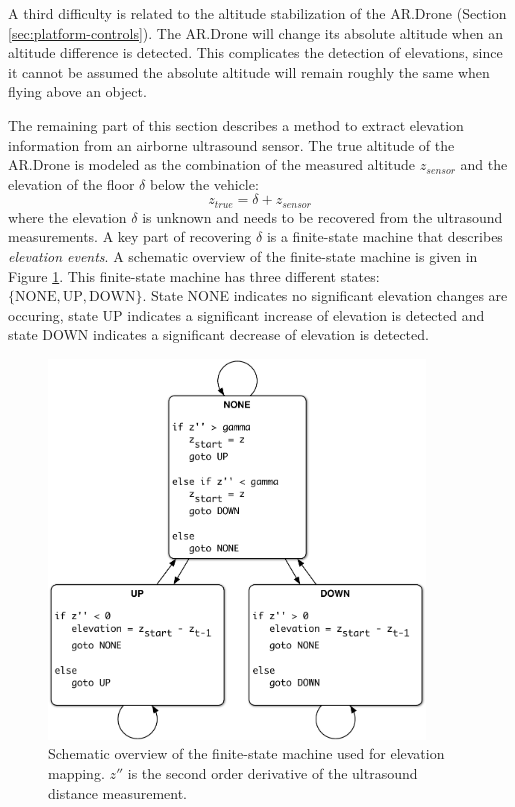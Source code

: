 A third difficulty is related to the altitude stabilization of the AR.Drone (Section \ref{sec:platform-controls}).
The AR.Drone will change its absolute altitude when an altitude difference is detected.
This complicates the detection of elevations, since it cannot be assumed the absolute altitude will remain roughly the same when flying above an object.

The remaining part of this section describes a method to extract elevation information from an airborne ultrasound sensor.
The true altitude of the AR.Drone is modeled as the combination of the measured altitude $z_{sensor}$ and the elevation of the floor $\delta$ below the vehicle:
\begin{equation}
z_{true} = \delta + z_{sensor}
\end{equation}
where the elevation $\delta$ is unknown and needs to be recovered from the ultrasound measurements.
A key part of recovering $\delta$ is a finite-state machine that describes \textit{elevation events}.
A schematic overview of the finite-state machine is given in Figure \ref{fig:elevation_map_fsm}.
This finite-state machine has three different states: $\{ \text{NONE}, \text{UP}, \text{DOWN} \}$.
State NONE indicates no significant elevation changes are occuring, state UP indicates a significant increase of elevation is detected and state DOWN indicates a significant decrease of elevation is detected.

\begin{figure}[htb]
\centering
\includegraphics[width=10cm]{images/elevation_map_fsm.pdf}
\caption{Schematic overview of the finite-state machine used for elevation mapping. $z''$ is the second order derivative of the ultrasound distance measurement.}
\label{fig:elevation_map_fsm}
\end{figure}

